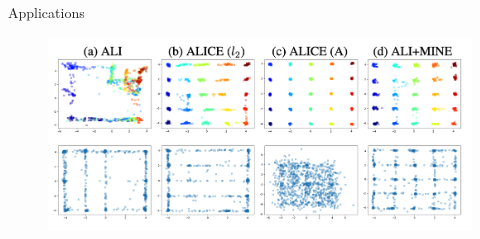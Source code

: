 \documentclass[final]{beamer}
\newlength{\colwidth}
\begin{document}
\begin{frame}[t]
\begin{columns}[t]
\begin{column}{\colwidth}
\begin{block}{Applications}
\begin{itemize}
    \begin{figure}
        \centering
        \includegraphics[width=0.95\linewidth]{截屏2024-12-31 11.20.38.png}
    \end{figure}
        
    
\end{itemize}



\end{block}
\end{column}
\end{columns}
\end{frame}
\end{document}

